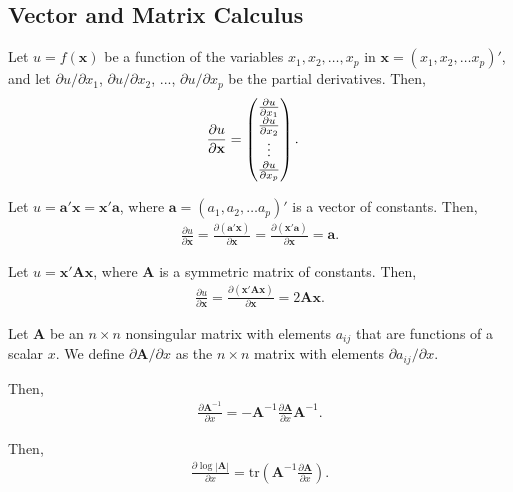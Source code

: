 \newpage
\subsection{Vector and Matrix Calculus}

\bdefi
Let $u=f({\mathbf x})$ be a function of the variables $x_1, x_2, \ldots , x_p$ in ${\mathbf x} = (x_1, x_2, \ldots x_p)'$, and let ${\partial u}/{\partial x_1}$, ${\partial u}/{\partial x_2}$, ...,  ${\partial u}/{\partial x_p}$ be the partial derivatives. 
Then, %
\begin{align}
\frac{\partial u}{\partial {\bf x}} &=
\begin{pmatrix}
\frac{\partial u}{\partial x_1}\\ 
\frac{\partial u}{\partial x_2}\\
\vdots\\
\frac{\partial u}{\partial x_p}
\end{pmatrix}. \nonumber
\end{align}
\edefi

\bstheo
Let $u={\mathbf a}'{\mathbf x} = {\mathbf x}'{\mathbf a}$, where ${\mathbf a} = (a_1, a_2, \ldots a_p)'$ is a vector of constants. Then,
\begin{align}
\frac{\partial u}{\partial {\mathbf x}} = \frac{\partial ({\mathbf a}'{\mathbf x}) }{\partial {\mathbf x}} = \frac{\partial ({\mathbf x}'{\mathbf a}) }{\partial {\mathbf x}} ={\mathbf a}. \nonumber
\end{align}
\estheo

\vb

\bstheo
Let $u = {\mathbf x}'{\mathbf A}{\mathbf x}$, where ${\mathbf A}$ is a symmetric matrix of constants. Then,
\begin{align}
\frac{\partial u}{\partial {\mathbf x}} = \frac{\partial ({\mathbf x}'{\mathbf A}{\mathbf x}) }{\partial {\mathbf x}} =  2{\mathbf A}{\mathbf x}. \nonumber
\end{align}
\estheo


\bdefi
Let ${\mathbf A}$ be an $n \times n$ nonsingular matrix with elements $a_{ij}$ that are functions of a scalar $x$. We define ${\partial {\mathbf A}} / {\partial x}$ as the $n \times n$ matrix 
with elements  ${\partial a_{ij}} / {\partial x}$.
\edefi

\bstheo
Then,
\begin{align}
\frac{\partial {\mathbf A^{-1}}}{\partial x} = -{\mathbf A^{-1}}  \frac{\partial {\mathbf A}}{\partial x}   {\mathbf A^{-1}}. \nonumber
\end{align}
\estheo


\bstheo
Then,
\begin{align}
\frac{\partial {\log |{\mathbf A}|}}{ \partial x} =  \mathrm{tr} ({\mathbf A^{-1}}  \frac{\partial {\mathbf A}}{\partial x}). \nonumber
\end{align}
\estheo




